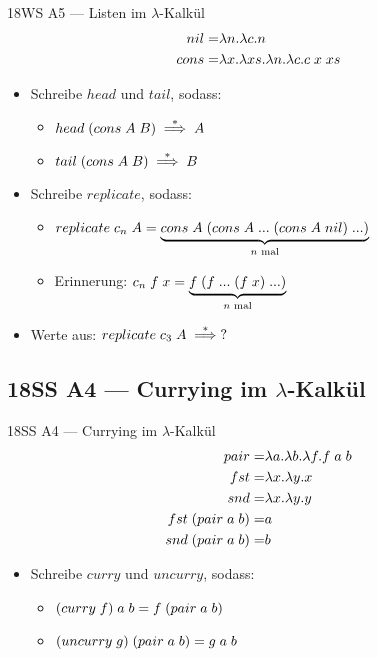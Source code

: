 \documentclass{beamer}
\begin{document}
\begin{frame}{18WS A5 --- Listen im $\lambda$-Kalkül}
	\begin{eqnarray*}
		nil  =& \lambda{}n.\lambda{}c.n \\
		cons =& \lambda{}x.\lambda{}xs.\lambda{}n.\lambda{}c.c\;{}x\;{}xs
	\end{eqnarray*}

	\begin{itemize}
		\item Schreibe $head$ und $tail$, sodass:
		\begin{itemize}
			\item $head\;{}(cons\;{}A\;{}B) \stackrel{*}{\implies} A$
			\item $tail\;{}(cons\;{}A\;{}B) \stackrel{*}{\implies} B$
		\end{itemize}
		\pause
		\item Schreibe $replicate$, sodass:
		\begin{itemize}
			\item $replicate\;{}c_n\;{}A = \underbrace{cons\;{}A\;{}(cons\;{}A\;{}...\;{}(cons\;{}A\;{}nil)\;{}...)}_\text{$n$ mal}$
			\item Erinnerung: $c_n\;{}f\;{}x = \underbrace{f\;{}(f\;{}...\;{}(f\;{}x)\;{}...)}_\text{$n$ mal}$
		\end{itemize}
		\pause
		\item Werte aus: $replicate\;{}c_3\;{}A \stackrel{*}{\implies} ?$
	\end{itemize}
\end{frame}

\subsection{18SS A4 --- Currying im $\lambda$-Kalkül}

\begin{frame}{18SS A4 --- Currying im $\lambda$-Kalkül}
	\begin{eqnarray*}
		pair =& \lambda{}a.\lambda{}b.\lambda{}f.f\;{}a\;{}b \\
		fst  =& \lambda{}x.\lambda{}y.x \\
		snd  =& \lambda{}x.\lambda{}y.y \\
		fst\;{}(pair\;{}a\;{}b) =& a \\
		snd\;{}(pair\;{}a\;{}b) =& b \\
	\end{eqnarray*}

	\begin{itemize}
		\item Schreibe $curry$ und $uncurry$, sodass:
		\begin{itemize}
			\item $\liiin{\lii{curry}{f}}{a}{b} = \liiin{f}{\liii{pair}{a}{b}}$
			\item $(uncurry\;{}g)\;{}(pair\;{}a\;{}b) = g\;{}a\;{}b$
		\end{itemize}
	\end{itemize}
\end{frame}
\end{document}
